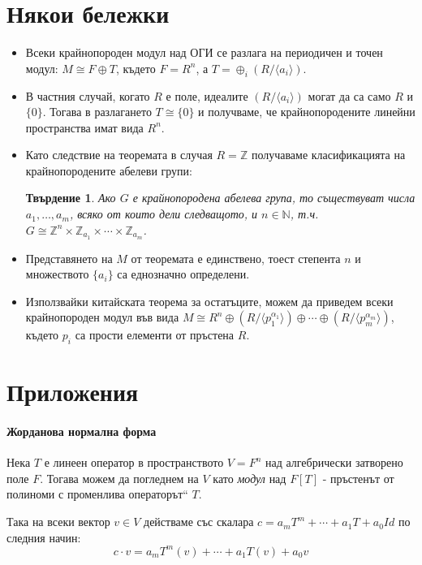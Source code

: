 \documentclass{article}
\newif\ifusemulticols
\theoremstyle{definition}
\theoremstyle{remark}
\theoremstyle{plain}
\theoremstyle{plain}
\newtheorem{prop}[theorem]{Твърдение}
\newenvironment{mymulticols}
    { \ifusemulticols \begin{multicols}{2} \fi }
    { \ifusemulticols \end{multicols} \fi }
\newcommand{\N}{\mathbb{N}}
\newcommand{\Z}{\mathbb{Z}}
\begin{document}
\begin{mymulticols}
\section{Някои бележки}%

\begin{itemize}
    \item Всеки крайнопороден модул над ОГИ се разлага на периодичен и точен модул: $M \cong F
        \oplus T$, където $F = R^n$, а $T = \oplus_i (R/\langle a_i \rangle)$.
    \item В частния случай, когато $R$ е поле, идеалите $(R/\langle a_i \rangle)$ могат да са само
        $R$ и $\{0\}$. Тогава в разлагането $T \cong \{ 0 \}$ и получваме, че крайнопородените
        линейни пространства имат вида $R^n$.
    \item Като следствие на теоремата в случая $R = \Z$ получаваме класификацията на
        крайнопородените абелеви групи:
        \begin{prop}
            Ако $G$ е крайнопородена абелева група, то съществуват числа $a_1,\ldots,a_m$, всяко от които
            дели следващото, и $n \in \N$, т.ч. $G \cong \Z^n \times \Z_{a_1} \times \cdots \times
            \Z_{a_m}$.
        \end{prop}
    \item Представянето на $M$ от теоремата е единствено, тоест степента $n$ и множеството $\{ a_i
        \}$ са еднозначно определени.
    \item Използвайки китайската теорема за остатъците, можем да приведем всеки крайнопороден модул
        във вида $M \cong R^n \oplus (R/{\langle p_1^{\alpha_1} \rangle}) \oplus \cdots \oplus
        (R/{\langle p_m^{\alpha_m}} \rangle)$, където $p_i$ са прости елементи от пръстена $R$.
\end{itemize}

\section{Приложения}%
\paragraph{Жорданова нормална форма}
Нека $T$ е линеен оператор в пространството $V = F^n$ над алгебрически затворено поле $F$. Тогава
можем да погледнем на $V$ като \emph{модул} над $F[T]$ - пръстенът от полиноми с променлива
\quotedblbase операторът`` $T$.

Така на всеки вектор $v \in V$ действаме със скалара $c = a_m T^m + \cdots + a_1 T + a_0 Id$ по
следния начин:
$$c\cdot v = a_m T^m(v) + \cdots + a_1 T(v) + a_0 v$$


\end{mymulticols}
\end{document}
